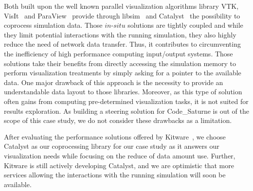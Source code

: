 Both built upon the well known parallel visualization algorithms
library VTK, VisIt~\cite{1532795} and ParaView~\cite{964413} provide through
libsim~\cite{2386230} and Catalyst~\cite{6092322} the possibility to coprocess
simulation data.  Those $in$-$situ$ solutions are tightly coupled and while they
limit potential interactions with the running simulation, they also highly
reduce the need of network data transfer. Thus, it contributes to circumventing
the inefficiency of high performance computing input/output systems.
Those solutions take their benefits from directly accessing the simulation memory to
perform visualization treatments by simply asking for a pointer to the available
data. One major drawback of this approach is the necessity to provide an
understandable data layout to those libraries. Moreover, as this type of
solution often gains from computing pre-determined visualization tasks, it is
not suited for results exploration.  As building a steering solution for Code\_Saturne is out of
the scope of this case study, we do not consider these drawbacks as a limitation. 

After evaluating the performance solutions offered by Kitware~\cite{6092322}, we choose Catalyst as our coprocessing library for our 
case study as it answers our visualization needs while focusing on the 
reduce of data amount use. Further, Kitware is still actively developing 
Catalyst, and we are optimistic that more services allowing the interactions
with the running simulation will soon be available.

